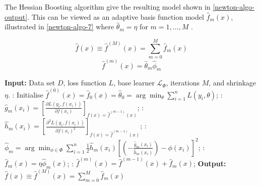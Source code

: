 The Hessian Boosting algorithm give the resulting model shown in \autoref{newton-algo-output}. This can be viewed as an adaptive basis function model $\hat{f}_m(x)$, illustrated in \autoref{newton-algo-7} where $\hat{\theta}_m=\eta$ for $m=1,\dots,M$ \parencite{ntnu-thesis-why-does-xgboost-win-every-machine-learning-competition}. 

\begin{equation}
\label{newton-algo-output}
    \hat{f}(x) \equiv \hat{f}^{(M)}(x) = \sum_{m=0}^M\hat{f}_m(x)
\end{equation}
\begin{equation}
\label{newton-algo-7}
    \hat{f}^{(m)}(x)=\hat{\theta}_{m}\hat{\phi}_m
\end{equation}

\begin{algorithm}[H]
\caption{Hessian Boosting algorithm}
\label{extreme-gradient-algo}
\begin{algorithmic}
\Statex \textbf{Input:} Data set \(D\), loss function \(L\), base learner \(\mathcal{L}_{\Phi}\), iterations $M$, and shrinkage \(\eta\).
\vspace{1em}
: Initialise \(\hat{f}^{(0)}(x) = \hat{f}_0(x) = \hat{\theta}_0 = \arg\min_{\theta} \sum_{i=1}^n L(y_i, \theta)\);
\vspace{1em}
\vspace{1em}
    \Statex {}: $\hat{g}_{m}(x_i) = \left[\frac{\partial L(y_i, f(x_i))}{\partial f(x_i)} \right]_{f(x)=\hat{f}^{(m-1)}(x)}$;
    \vspace{1em}
    \Statex {}: $\hat{h}_{m}(x_i)=\left[\frac{\partial^{2} L(y_i, f(x_i))}{\partial f(x_i)^{2}} \right]_{f(x)=\hat{f}^{(m-1)}(x)}$;
    \vspace{1em}
    \Statex {}: \(\hat{\phi}_m = \arg\min_{\phi \in \Phi} \sum_{i=1}^n \frac{1}{2} \hat{h}_m(x_i) \left[ (- \frac{\hat{g}_m(x_i)}{\hat{h}_m(x_i)}) - \phi(x_i) \right]^2 \);
    \vspace{1em}
    \Statex {}: \(\hat{f}_m(x) = \eta \hat{\phi}_m(x)\);
    \vspace{1em}
    \Statex {}: \(\hat{f}^{(m)}(x) = \hat{f}^{(m-1)}(x) + \hat{f}_m(x)\);
\vspace{1em}
\EndFor
\vspace{1em}
\Statex \textbf{Output:} \(\hat{f}(x) \equiv \hat{f}^{(M)}(x) = \sum_{m=0}^M \hat{f}_m(x)\)
\end{algorithmic}
\end{algorithm}




